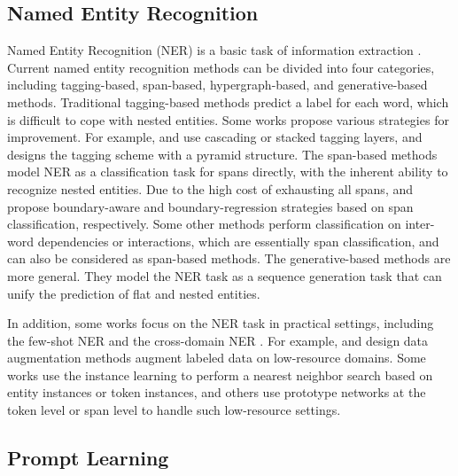 \documentclass[11pt]{article}
\begin{document}
\subsection{Named Entity Recognition}
Named Entity Recognition (NER) is a basic task of information extraction \citep{tjong-kim-sang-de-meulder-2003-introduction, wadden-etal-2019-entity, 10.1145/3442381.3449895, tan-etal-2022-query}.
Current named entity recognition methods can be divided into four categories, including tagging-based, span-based, hypergraph-based, and generative-based methods. Traditional tagging-based methods \citep{ma-hovy-2016-end} predict a label for each word, which is difficult to cope with nested entities. Some works propose various strategies for improvement. For example, \citet{alex-etal-2007-recognising} and \citet{ju-etal-2018-neural} use cascading or stacked tagging layers, and \citet{wang-etal-2020-pyramid} designs the tagging scheme with a pyramid structure. The span-based methods \citep{sohrab-miwa-2018-deep} model NER as a classification task for spans directly, with the inherent ability to recognize nested entities. Due to the high cost of exhausting all spans, \citet{zheng-etal-2019-boundary} and \citet{shen-etal-2021-locate} propose boundary-aware and boundary-regression strategies based on span classification, respectively. Some other methods \citep{ yu-etal-2020-named, li2022unified} perform classification on inter-word dependencies or interactions, which are essentially span classification, and can also be considered as span-based methods.
The generative-based methods \citep{yan-etal-2021-unified-generative, lu-etal-2022-unified, zhang-etal-2022-de} are more general. They model the NER task as a sequence generation task that can unify the prediction of flat and nested entities.

In addition, some works focus on the NER task in practical settings, including the few-shot NER \citep{ding-etal-2021-nerd} and the cross-domain NER \citep{Liu_Xu_Yu_Dai_Ji_Cahyawijaya_Madotto_Fung_2021}. For example, \citet{chen-etal-2021-data} and \citet{zhou-etal-2022-melm} design data augmentation methods augment labeled data on low-resource domains. Some works \citep{DBLP:journals/corr/abs-2008-10570, wiseman-stratos-2019-label} use the instance learning to perform a nearest neighbor search based on entity instances or token instances, and others \citep{ding-etal-2021-nerd, huang-etal-2021-shot} use prototype networks at the token level or span level to handle such low-resource settings. 

\subsection{Prompt Learning}
\end{document}
